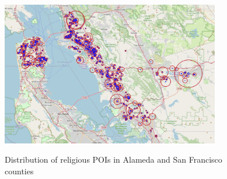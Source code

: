 \documentclass[12pt,english]{article}
\begin{document}
\begin{figure}[h]
	\centering
	\caption{\small Distribution of religious POIs in Alameda and San Francisco counties}
	\includegraphics[width=0.85\textwidth, center]{./figures/2.POIs.png}
	\captionsetup{width=1.0\textwidth}
	\label{figure3}
\end{figure}




\pagebreak
\begingroup
{}
\setlength\bibitemsep{0pt}
\endgroup
\pagebreak
\end{document}
